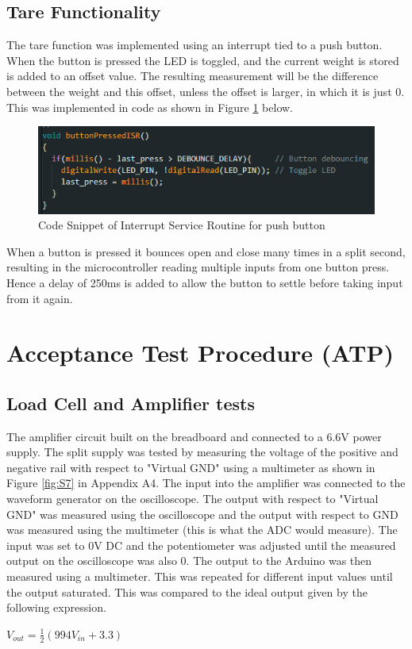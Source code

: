 \documentclass[class=report,11pt,crop=false]{standalone}
\begin{document}
	\subsection{Tare Functionality}
	The tare function was implemented using an interrupt tied to a push button. When the button is pressed the LED is toggled, and the current weight is stored is added to an offset value. The resulting measurement will be the difference between the weight and this offset, unless the offset is larger, in which it is just 0. This was implemented in code as shown in Figure \ref{fig:S16} below.
	\begin{figure}[h!]
		\centering
		\includegraphics[width=0.7\linewidth]{Figures/ButtonPressed.png}
		\caption{Code Snippet of Interrupt Service Routine for push button}
		\label{fig:S16}
	\end{figure}
	When a button is pressed it bounces open and close many times in a split second, resulting in the microcontroller reading multiple inputs from one button press. Hence a delay of 250ms is added to allow the button to settle before taking input from it again. 
	
	\section{Acceptance Test Procedure (ATP)}
	\subsection{Load Cell and Amplifier tests}
	The amplifier circuit built on the breadboard and connected to a 6.6V power supply. The split supply was tested by measuring the voltage of the positive and negative rail with respect to "Virtual GND" using a multimeter as shown in Figure \ref{fig:S7} in Appendix A4.
	The input into the amplifier was connected to the waveform generator on the oscilloscope. The output with respect to "Virtual GND" was measured using the oscilloscope and the output with respect to GND was measured using the multimeter (this is what the ADC would measure). The input was set to 0V DC and the potentiometer was adjusted until the measured output on the oscilloscope was also 0. The output to the Arduino was then measured using a multimeter. This was repeated for different input values until the output saturated. This was compared to the ideal output given by the following expression.
	\begin{center}
		$V_{out}=\frac{1}{2}\left(994V_{in} + 3.3\right)$ \\
	\end{center}
	
\end{document}
